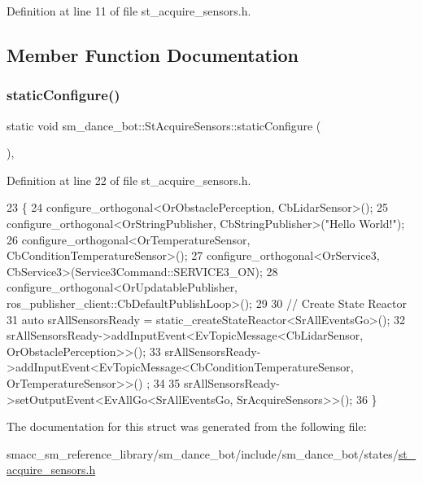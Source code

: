 Definition at line 11 of file st\+\_\+acquire\+\_\+sensors.\+h.



\subsection{Member Function Documentation}
\mbox{\label{structsm__dance__bot_1_1StAcquireSensors_a4b0a4fcd72ddfee7f81b3be252c8597f}} 
\subsubsection{\texorpdfstring{static\+Configure()}{staticConfigure()}}
{\footnotesize\ttfamily static void sm\+\_\+dance\+\_\+bot\+::\+St\+Acquire\+Sensors\+::static\+Configure (\begin{DoxyParamCaption}{ }\end{DoxyParamCaption})\hspace{0.3cm}{\ttfamily [inline]}, {\ttfamily [static]}}



Definition at line 22 of file st\+\_\+acquire\+\_\+sensors.\+h.


\begin{DoxyCode}
23    \{
24       configure\_orthogonal<OrObstaclePerception, CbLidarSensor>();
25       configure\_orthogonal<OrStringPublisher, CbStringPublisher>(\textcolor{stringliteral}{"Hello World!"});
26       configure\_orthogonal<OrTemperatureSensor, CbConditionTemperatureSensor>();
27       configure\_orthogonal<OrService3, CbService3>(Service3Command::SERVICE3\_ON);
28       configure\_orthogonal<OrUpdatablePublisher, ros\_publisher\_client::CbDefaultPublishLoop>();
29 
30       \textcolor{comment}{// Create State Reactor}
31       \textcolor{keyword}{auto} srAllSensorsReady = static\_createStateReactor<SrAllEventsGo>();
32       srAllSensorsReady->addInputEvent<EvTopicMessage<CbLidarSensor, OrObstaclePerception>>();
33       srAllSensorsReady->addInputEvent<EvTopicMessage<CbConditionTemperatureSensor, OrTemperatureSensor>>()
      ;
34 
35       srAllSensorsReady->setOutputEvent<EvAllGo<SrAllEventsGo, SrAcquireSensors>>();
36    \}
\end{DoxyCode}


The documentation for this struct was generated from the following file\+:\begin{DoxyCompactItemize}
\item 
smacc\+\_\+sm\+\_\+reference\+\_\+library/sm\+\_\+dance\+\_\+bot/include/sm\+\_\+dance\+\_\+bot/states/\hyperlink{include_2sm__dance__bot_2states_2st__acquire__sensors_8h}{st\+\_\+acquire\+\_\+sensors.\+h}\end{DoxyCompactItemize}
